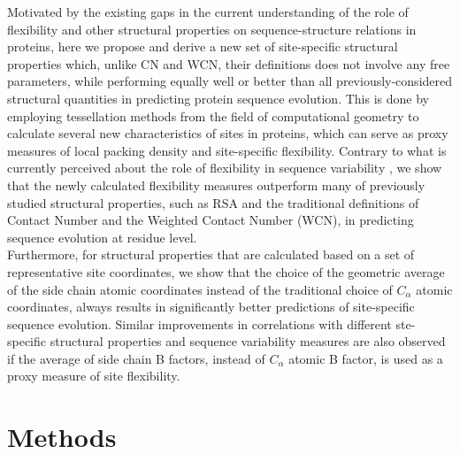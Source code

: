 \documentclass[11pt]{article}
\begin{document}
    Motivated by the existing gaps in the current understanding of the role of flexibility and other structural properties on sequence-structure relations in proteins, here we propose and derive a new set of site-specific structural properties which, unlike CN and WCN, their definitions does not involve any free parameters, while performing equally well or better than all previously-considered structural quantities in predicting protein sequence evolution. This is done by employing tessellation methods from the field of computational geometry to calculate several new characteristics of sites in proteins, which can serve as proxy measures of local packing density and site-specific flexibility. Contrary to what is currently perceived about the role of flexibility in sequence variability \citep[e.g.,][]{huang_mechanistic_2014}, we show that the newly calculated flexibility measures outperform many of previously studied structural properties, such as RSA and the traditional definitions of Contact Number and the Weighted Contact Number (WCN), in predicting sequence evolution at residue level. \\

    Furthermore, for structural properties that are calculated based on a set of representative site coordinates,  we show that the choice of the geometric average of the side chain atomic coordinates instead of the traditional choice of $C_\alpha$ atomic coordinates, always results in significantly better predictions of site-specific sequence evolution. Similar improvements in correlations with different ste-specific structural properties and sequence variability measures are also observed if the average of side chain B factors, instead of $C_\alpha$ atomic B factor, is used as a proxy measure of site flexibility.


\section{Methods}
\label{sec:methods}
\end{document}
